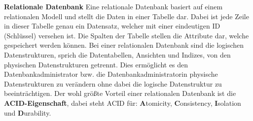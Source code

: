 \textbf{Relationale Datenbank}
\newline
Eine relationale Datenbank basiert auf einem relationalen Modell und stellt die Daten in einer Tabelle dar. Dabei ist jede Zeile in dieser Tabelle genau ein Datensatz, welcher mit einer eindeutigen ID (Schlüssel) versehen ist. Die Spalten der Tabelle stellen die Attribute dar, welche gespeichert werden können. Bei einer relationalen Datenbank sind die logischen Datenstrukturen, sprich die Datentabellen, Ansichten und Indizes, von den physischen Datenstrukturen getrennt. Dies ermöglicht es den Datenbankadministrator bzw. die Datenbankadministratorin physische Datenstrukturen zu verändern ohne dabei die logische Datenstruktur zu beeinträchtigen. 
\newline
Der wohl größte Vorteil einer relationalen Datenbank ist die \textbf{ACID-Eigenschaft}, dabei steht ACID für: \textbf{A}tomicity, \textbf{C}onsistency, \textbf{I}solation und \textbf{D}urability.

